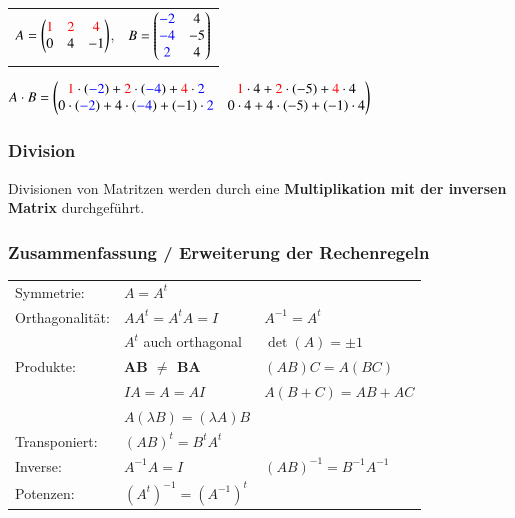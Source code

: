 	\vspace{0.2cm}

\begin{tabular}{ll}
	$A =
	\begin{pmatrix}
		\color{red}1&\color{red}2&\color{red}4\\
		0&4&-1
	\end{pmatrix}$, &
	$B =
	\begin{pmatrix}
		\color{blue}-2&4\\
		\color{blue}-4&-5\\
		\color{blue}2&4
	\end{pmatrix} $
\end{tabular}
	
$A \cdot B =
	\begin{pmatrix}
		{\color{red}1}\cdot({\color{blue}-2})+{\color{red}2}\cdot({\color{blue}-4})+{\color{red}4}\cdot{\color{blue}2} &
		{\color{red}1}\cdot 4+{\color{red}2}\cdot(-5)+{\color{red}4}\cdot 4\\
		0\cdot ({\color{blue}-2})+4\cdot({\color{blue}-4})+(-1)\cdot {\color{blue}2} &
		0\cdot 4+4\cdot(-5)+(-1)\cdot 4
	\end{pmatrix}$


\subsubsection{Division}
			
Divisionen von Matritzen werden durch eine \textbf{Multiplikation mit der inversen Matrix} durchgeführt.


\subsubsection{Zusammenfassung / Erweiterung der Rechenregeln}
   			
\begin{tabular}{lll}
	Symmetrie: 			& $ A = A^t$		 												\\   			
	Orthagonalität: 	&  $ A A^t = A^t A = I $  			& $A^{-1} = A^t$				\\
						& $A^t$ auch orthagonal 			& $\det(A) = \pm 1$ 			\\
	Produkte: 			& \textbf{AB $\neq$ BA} 			& $(AB)C = A(BC)$				\\
						& $IA = A = AI$  					& $A(B + C) = AB + AC$			\\
						& $A (\lambda B) = (\lambda A) B$ 							\\
	Transponiert: 		& $(AB)^t = B^t A^t $ 												\\
	Inverse: 			& $A^{-1} A = I$ 					& $(AB)^{-1} = B^{-1} A^{-1} $ 	\\
	Potenzen: 			& $(A^t)^{-1} = (A^{-1})^t $
\end{tabular}


